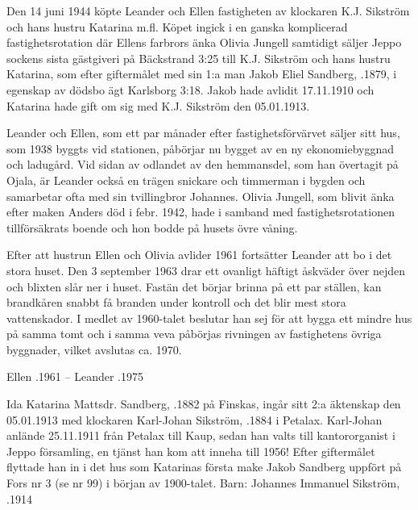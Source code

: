 {{{{Den 14 juni 1944 köpte Leander och Ellen fastigheten av klockaren K.J. Sikström och hans hustru Katarina  m.fl. Köpet ingick i en ganska komplicerad fastighetsrotation där Ellens farbrors änka Olivia Jungell samtidigt säljer Jeppo sockens sista gästgiveri på Bäckstrand 3:25 till K.J. Sikström och hans hustru Katarina, som efter giftermålet med sin 1:a man Jakob Eliel Sandberg, .1879, i egenskap av dödsbo ägt Karlsborg 3:18. Jakob hade avlidit 17.11.1910 och Katarina hade gift om sig med K.J. Sikström den 05.01.1913.

Leander och Ellen, som ett par månader efter fastighetsförvärvet säljer sitt hus, som 1938 byggts vid stationen, påbörjar nu bygget av en ny ekonomiebyggnad och ladugård. Vid sidan av odlandet av den hemmansdel, som han övertagit på Ojala, är Leander också en trägen snickare och timmerman i bygden och samarbetar ofta med sin tvillingbror Johannes. Olivia Jungell, som blivit änka efter maken Anders död i febr. 1942, hade i samband med fastighetsrotationen tillförsäkrats boende och hon bodde på husets övre våning.

Efter att hustrun Ellen och Olivia avlider 1961 fortsätter Leander att bo i det stora huset. Den 3 september 1963 drar ett ovanligt häftigt åskväder över nejden och blixten slår ner i huset. Fastän det börjar brinna på ett par ställen, kan brandkåren snabbt få branden under kontroll och det blir mest stora vattenskador. I medlet av 1960-talet beslutar han sej för att bygga ett mindre hus på samma tomt och i samma veva påbörjas rivningen av fastighetens övriga byggnader, vilket avslutas ca. 1970.
\begin{jhchildren}
  \item {}
  \item {}
\end{jhchildren}

Ellen .1961  --  Leander .1975


Ida Katarina Mattsdr. Sandberg, .1882 på Finskas, ingår sitt 2:a äktenskap den 05.01.1913 med klockaren Karl-Johan Sikström, .1884 i Petalax. Karl-Johan anlände 25.11.1911 från Petalax till Kaup, sedan han valts till kantororganist i Jeppo församling, en tjänst han kom att inneha till 1956! Efter giftermålet flyttade han in i det hus som Katarinas första make Jakob Sandberg uppfört på Fors nr 3 (se nr 99) i början av 1900-talet.
Barn: Johannes Immanuel Sikström, .1914

}}}}
